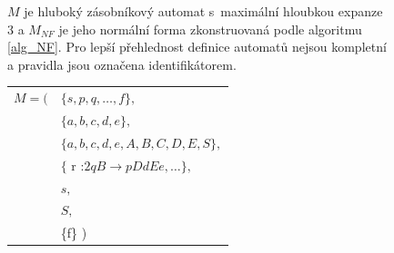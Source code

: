 \begin{figure}[ht]
\begin{Example} \label{example_NF}
$M$ je hluboký zásobníkový automat s~maximální hloubkou expanze 3 a $M_{NF}$ je jeho normální forma zkonstruovaná podle algoritmu \ref{alg_NF}. Pro lepší přehlednost definice automatů nejsou kompletní a
pravidla jsou označena identifikátorem.
\medskip

\setlength{\deftabcolsep}{\tabcolsep}
\setlength{\tabcolsep}{1pt}

\begin{tabular}{ll}

$M = ($&$\{s,p,q, \dots, f\},$ \\
     &$\{a,b,c,d,e\}, $\\
     &$\{a,b,c,d,e,A,B,C,D,E,S\},$ \\
     &$\{$ r :\quad$ 2q B \rightarrow p DdEe, \dots\},$\\
     &$s,$ \\
     &$S,$ \\
     &\{f\} )
\end{tabular}

\bigskip

\begin{tabular}{llp{12cm}l}


\end{tabular}
\end{Example}
\end{figure}
